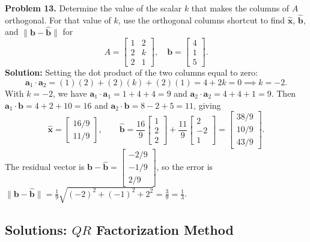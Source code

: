 \documentclass[11pt, letterpaper]{article}
\theoremstyle{definition}
\theoremstyle{remark}
\begin{document}
\textbf{Problem 13.} Determine the value of the scalar $k$ that makes the columns of $A$ orthogonal. For that value of $k$, use the orthogonal columns shortcut to find $\hat{\mathbf{x}}$, $\hat{\mathbf{b}}$, and $\|\mathbf{b} - \hat{\mathbf{b}}\|$ for
\[
A = \begin{bmatrix} 1 & 2 \\ 2 & k \\ 2 & 1 \end{bmatrix}, \quad \mathbf{b} = \begin{bmatrix} 4 \\ 1 \\ 5 \end{bmatrix}.
\]
\textbf{Solution:} Setting the dot product of the two columns equal to zero:
\[
\mathbf{a}_1 \cdot \mathbf{a}_2 = (1)(2) + (2)(k) + (2)(1) = 4 + 2k = 0 \implies k = -2.
\]
With $k = -2$, we have $\mathbf{a}_1 \cdot \mathbf{a}_1 = 1+4+4 = 9$ and $\mathbf{a}_2 \cdot \mathbf{a}_2 = 4+4+1 = 9$. Then $\mathbf{a}_1 \cdot \mathbf{b} = 4+2+10 = 16$ and $\mathbf{a}_2 \cdot \mathbf{b} = 8-2+5 = 11$, giving
\[
\hat{\mathbf{x}} = \begin{bmatrix} 16/9 \\ 11/9 \end{bmatrix}, \qquad \hat{\mathbf{b}} = \frac{16}{9}\begin{bmatrix} 1 \\ 2 \\ 2 \end{bmatrix} + \frac{11}{9}\begin{bmatrix} 2 \\ -2 \\ 1 \end{bmatrix} = \begin{bmatrix} 38/9 \\ 10/9 \\ 43/9 \end{bmatrix}.
\]
The residual vector is $\mathbf{b} - \hat{\mathbf{b}} = \begin{bmatrix} -2/9 \\ -1/9 \\ 2/9 \end{bmatrix}$, so the error is $\|\mathbf{b} - \hat{\mathbf{b}}\| = \frac{1}{9}\sqrt{(-2)^2 + (-1)^2 + 2^2} = \frac{3}{9} = \frac{1}{3}$.

\subsection{Solutions: $QR$ Factorization Method}
\end{document}
